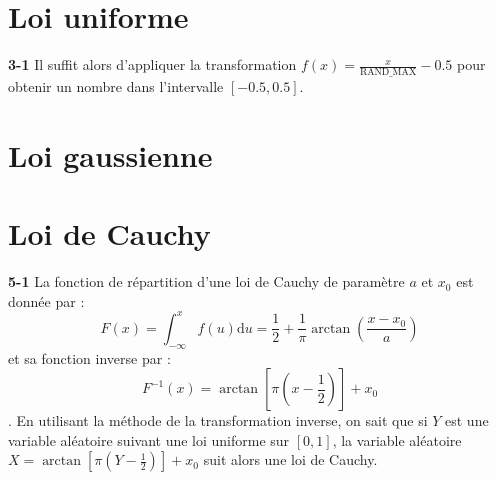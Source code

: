 \documentclass[a4paper,10pt]{article}
\begin{document}
\section{Loi uniforme}

\textbf{3-1} Il suffit alors d'appliquer la transformation $f(x) = \frac{x}{\text{RAND\_MAX}} - 0.5$ pour obtenir un nombre dans l'intervalle $\left[-0.5, 0.5\right]$.

\section{Loi gaussienne}

\section{Loi de Cauchy}

\textbf{5-1} La fonction de répartition d'une loi de Cauchy de paramètre $a$ et $x_0$ est donnée par :
\begin{equation}
	F(x) = \int_{-\infty}^x f(u)\mathrm{d}u
	     = \frac{1}{2} + \frac{1}{\pi} \arctan\left(\frac{x-x_0}{a}\right)
\end{equation}
et sa fonction inverse par :
\begin{equation}
	F^{-1}(x) = \arctan\left[\pi\left(x-\frac{1}{2}\right)\right] + x_0
\end{equation}. En utilisant la méthode de la transformation inverse, on sait que si $Y$ est une variable aléatoire suivant une loi uniforme sur $\left[0, 1\right]$, la variable aléatoire $X = \arctan \left[\pi\left(Y-\frac{1}{2}\right)\right] + x_0$ suit alors une loi de Cauchy. 
\end{document}
